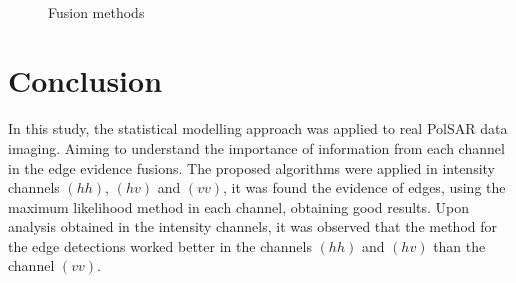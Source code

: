 \documentclass[conference]{IEEEtran}
\begin{document}
\begin{figure}[hbt]
	\centering
     \\
     \caption{Fusion methods}
     \label{fusion_met}
\end{figure}

\section{Conclusion}\label{sec_09}

In this study, the statistical modelling approach was applied to real PolSAR data imaging. 
Aiming to understand the importance of information from each channel in the edge evidence fusions. 
The proposed algorithms were applied in intensity channels $(hh)$, $(hv)$ and $(vv)$, it was found the evidence of edges, using the maximum likelihood  method in each channel, obtaining good results. Upon analysis obtained in the intensity channels, it was observed that the method for the edge detections worked better in the channels $(hh)$ and $(hv)$ than the channel $(vv)$.
\end{document}
